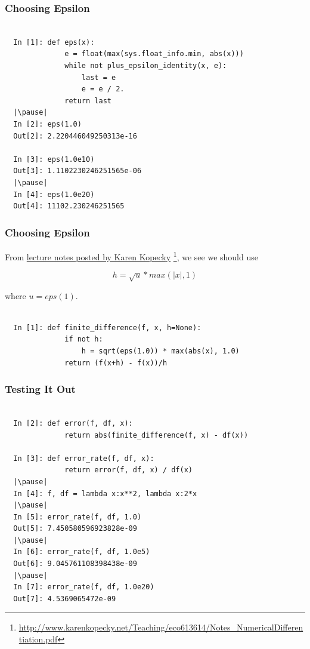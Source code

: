 \documentclass{beamer}
\def\abs#1{| #1 |}
\begin{document}
\begin{frame}[fragile]
\frametitle{Choosing Epsilon}

\begin{lstlisting}

  In [1]: def eps(x):
              e = float(max(sys.float_info.min, abs(x)))
              while not plus_epsilon_identity(x, e):
                  last = e
                  e = e / 2.
              return last
  |\pause|
  In [2]: eps(1.0)
  Out[2]: 2.220446049250313e-16

  In [3]: eps(1.0e10)
  Out[3]: 1.1102230246251565e-06
  |\pause|
  In [4]: eps(1.0e20)
  Out[4]: 11102.230246251565
\end{lstlisting}

\end{frame}

\begin{frame}[fragile]
\frametitle{Choosing Epsilon}

From \href{http://www.karenkopecky.net/Teaching/eco613614/Notes_NumericalDifferentiation.pdf}{lecture notes posted by Karen Kopecky} \footnote{\url{http://www.karenkopecky.net/Teaching/eco613614/Notes_NumericalDifferentiation.pdf}}, we see we should use

\[ h = \sqrt{u} * max(\abs{x}, 1) \]

where $u = eps(1)$.
\pause
\begin{lstlisting}

  In [1]: def finite_difference(f, x, h=None):
              if not h:
                  h = sqrt(eps(1.0)) * max(abs(x), 1.0)
              return (f(x+h) - f(x))/h

\end{lstlisting}

\end{frame}

\begin{frame}[fragile]
\frametitle{Testing It Out}

\begin{lstlisting}

  In [2]: def error(f, df, x):
              return abs(finite_difference(f, x) - df(x))

  In [3]: def error_rate(f, df, x):
              return error(f, df, x) / df(x)
  |\pause|
  In [4]: f, df = lambda x:x**2, lambda x:2*x
  |\pause|
  In [5]: error_rate(f, df, 1.0)
  Out[5]: 7.450580596923828e-09
  |\pause|
  In [6]: error_rate(f, df, 1.0e5)
  Out[6]: 9.045761108398438e-09
  |\pause|
  In [7]: error_rate(f, df, 1.0e20)
  Out[7]: 4.5369065472e-09
\end{lstlisting}

\end{frame}
\end{document}
